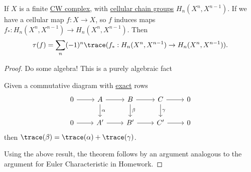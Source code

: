\begin{theorem}\label{thm-}
	If \(X\) is a finite \hyperref[def:CW-Complex]{CW complex}, with \hyperref[def:cellular-chain-complex]{cellular chain groups} \(H_n(X^n, X^{n - 1})\).
	If we have a cellular map \(f \colon X \to X\), so \(f\) induces maps \(f_\ast \colon H_n(X^n, X^{n - 1}) \to H_n(X^n, X^{n - 1})\). Then
	\[
		\tau(f) = \sum_n (-1)^n \trace(f_\ast : H_n(X^n, X^{n - 1}) \to H_n(X^n, X^{n - 1})).
	\]
\end{theorem}
\begin{proof}
	Do some algebra! This is a purely algebraic fact
	\begin{exercise}
		Given a commutative diagram with \hyperref[def:exact]{exact} rows
		\[
			\begin{tikzcd}
				0 & A & B & C & 0 \\
				0 & {A^\prime} & {B^\prime} & {C^\prime} & 0
				\arrow["\gamma", from=1-4, to=2-4]
				\arrow["\beta", from=1-3, to=2-3]
				\arrow["\alpha", from=1-2, to=2-2]
				\arrow[from=2-1, to=2-2]
				\arrow[from=2-2, to=2-3]
				\arrow[from=2-4, to=2-5]
				\arrow[from=2-3, to=2-4]
				\arrow[from=1-4, to=1-5]
				\arrow[from=1-3, to=1-4]
				\arrow[from=1-2, to=1-3]
				\arrow[from=1-1, to=1-2]
			\end{tikzcd}
		\]
		then \(\trace(\beta) = \trace(\alpha) + \trace(\gamma)\).
	\end{exercise}

	Using the above result, the theorem follows by an argument analogous to the argument for Euler Characteristic in Homework.
\end{proof}